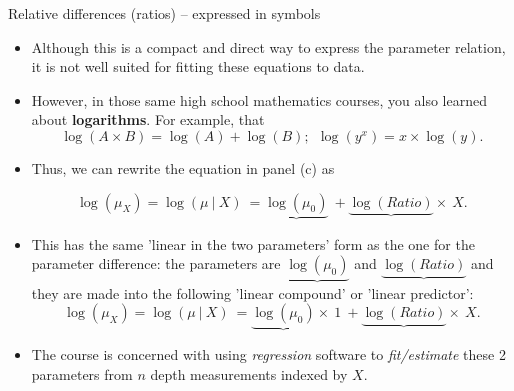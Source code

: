 \documentclass[10pt]{beamer}\usepackage[]{graphicx}\usepackage[]{color}
\begin{document}
		\begin{frame}[fragile]{Relative differences (ratios) -- expressed in symbols}
		
		\begin{itemize}
			\item Although this is a compact and direct way to express the parameter relation, it is not well suited for fitting these equations to data. 
	
	\item However, in those same  high school mathematics courses, you also learned about \textbf{logarithms}. For example, that 
	$$\log(A \times B) = \log(A) + \log(B); \ \  \log(y^x) = x \times \log(y).$$
	
	\item Thus, we can rewrite the equation in panel (c) as
	
	$$\log(\mu_X) = \log(\mu \ | \ X)  \ = \underbrace{\log(\mu_0)} \ +  \underbrace{\log(Ratio)} \times \ X.$$
	
	\item This has the same 'linear in the two parameters' form as the one for the parameter difference: the parameters are
	$\underbrace{\log(\mu_0)}$ and $\underbrace{\log(Ratio)}$ and they are made into the following 'linear compound' or 'linear predictor':
	$$\log(\mu_X) = \log(\mu \ | \ X)  \ = \underbrace{\log(\mu_0)} \times \ 1 \ + \underbrace{\log(Ratio)} \times \ X.$$
	
	\item The course is concerned with using \textit{regression} software to  \textit{fit/estimate} these 2 parameters from $n$ depth measurements indexed by $X$.

\end{itemize}
	
\end{frame}


\begin{frame}
\end{frame}
\end{document}
